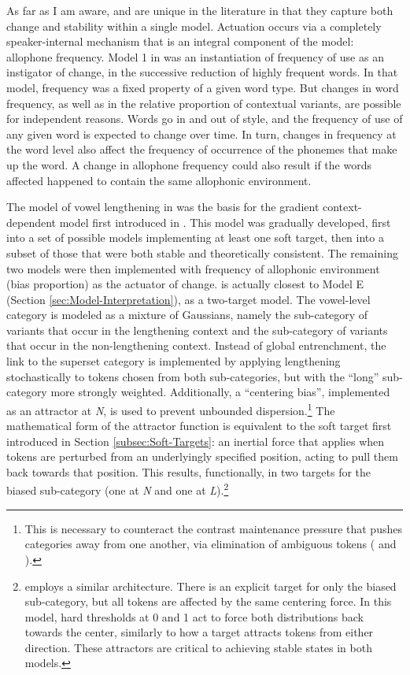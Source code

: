 As far as I am aware, \citet{soskuthy2013phonetic} and \citet{Soskuthy2015}
are unique in the literature in that they capture both change and
stability within a single model. Actuation occurs via a completely
speaker-internal mechanism that is an integral component of the model:
allophone frequency. Model 1 in 
was an instantiation of frequency of use as an instigator of change,
in the successive reduction of highly frequent words. In that model,
frequency was a fixed property of a given word type. But changes in
word frequency, as well as in the relative proportion of contextual
variants, are possible for independent reasons. Words go in and out
of style, and the frequency of use of any given word is expected to
change over time. In turn, changes in frequency at the word level
also affect the frequency of occurrence of the phonemes that make
up the word. A change in allophone frequency could also result if
the words affected happened to contain the same allophonic environment. 

The model of vowel lengthening in \citet{soskuthy2013phonetic} was
the basis for the gradient context-dependent model first introduced
in . This model was
gradually developed, first into a set of possible models implementing
at least one soft target, then into a subset of those that were both
stable and theoretically consistent. The remaining two models were
then implemented with frequency of allophonic environment (bias proportion)
as the actuator of change. \citet{soskuthy2013phonetic} is actually
closest to Model E (Section \ref{sec:Model-Interpretation}), as a
two-target  model. The vowel-level category is modeled
as a mixture of Gaussians, namely the sub-category of variants that
occur in the lengthening context and the sub-category of variants
that occur in the non-lengthening context. Instead of global entrenchment,
the link to the superset category is implemented by applying lengthening
stochastically to tokens chosen from both sub-categories, but with
the ``long'' sub-category more strongly weighted. Additionally, a “centering
bias”, implemented as an attractor at \emph{N}, is used to prevent
unbounded dispersion.\footnote{This is necessary to counteract the contrast maintenance pressure
that pushes categories away from one another, via elimination of ambiguous
tokens (\citet{Wedel2008} and \citet{Blevins2009}). } The mathematical form of the attractor function is equivalent to
the soft target first introduced in Section \ref{subsec:Soft-Targets}:
an inertial force that applies when tokens are perturbed from an underlyingly
specified position, acting to pull them back towards that position.
This results, functionally, in two targets for the biased sub-category
(one at \emph{N} and one at \emph{L}).\footnote{\citet{Soskuthy2015} employs a similar architecture. There is an
explicit target for only the biased sub-category, but all tokens are
affected by the same centering force. In this model, hard thresholds
at 0 and 1 act to force both distributions back towards the center,
similarly to how a target attracts tokens from either direction. These
attractors are critical to achieving stable states in both models.}

